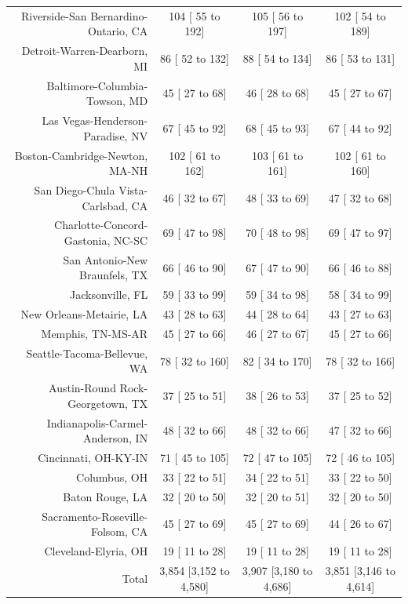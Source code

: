 \documentclass{article}
\begin{document}
\begin{table}[H]
\begin{tabular}{|r|c|c|c|}
		Riverside-San Bernardino-Ontario, CA &   104 [   55 to   192] &   105 [   56 to   197] &   102 [   54 to   189]\\
		Detroit-Warren-Dearborn, MI &    86 [   52 to   132] &    88 [   54 to   134] &    86 [   53 to   131]\\
		Baltimore-Columbia-Towson, MD &    45 [   27 to    68] &    46 [   28 to    68] &    45 [   27 to    67]\\
		Las Vegas-Henderson-Paradise, NV &    67 [   45 to    92] &    68 [   45 to    93] &    67 [   44 to    92]\\
		Boston-Cambridge-Newton, MA-NH &   102 [   61 to   162] &   103 [   61 to   161] &   102 [   61 to   160]\\
		San Diego-Chula Vista-Carlsbad, CA &    46 [   32 to    67] &    48 [   33 to    69] &    47 [   32 to    68]\\
		Charlotte-Concord-Gastonia, NC-SC &    69 [   47 to    98] &    70 [   48 to    98] &    69 [   47 to    97]\\
		San Antonio-New Braunfels, TX &    66 [   46 to    90] &    67 [   47 to    90] &    66 [   46 to    88]\\
		Jacksonville, FL &    59 [   33 to    99] &    59 [   34 to    98] &    58 [   34 to    99]\\
		New Orleans-Metairie, LA &    43 [   28 to    63] &    44 [   28 to    64] &    43 [   27 to    63]\\
		Memphis, TN-MS-AR &    45 [   27 to    66] &    46 [   27 to    67] &    45 [   27 to    66]\\
		Seattle-Tacoma-Bellevue, WA &    78 [   32 to   160] &    82 [   34 to   170] &    78 [   32 to   166]\\
		Austin-Round Rock-Georgetown, TX &    37 [   25 to    51] &    38 [   26 to    53] &    37 [   25 to    52]\\
		Indianapolis-Carmel-Anderson, IN &    48 [   32 to    66] &    48 [   32 to    66] &    47 [   32 to    66]\\
		Cincinnati, OH-KY-IN &    71 [   45 to   105] &    72 [   47 to   105] &    72 [   46 to   105]\\
		Columbus, OH &    33 [   22 to    51] &    34 [   22 to    51] &    33 [   22 to    50]\\
		Baton Rouge, LA &    32 [   20 to    50] &    32 [   20 to    51] &    32 [   20 to    50]\\
		Sacramento-Roseville-Folsom, CA &    45 [   27 to    69] &    45 [   27 to    69] &    44 [   26 to    67]\\
		Cleveland-Elyria, OH &    19 [   11 to    28] &    19 [   11 to    28] &    19 [   11 to    28]\\
		\hline
		Total & 3,854 [3,152 to 4,580] & 3,907 [3,180 to 4,686] & 3,851 [3,146 to 4,614]\\
		\hline
	\end{tabular}
\end{table}
\end{document}
